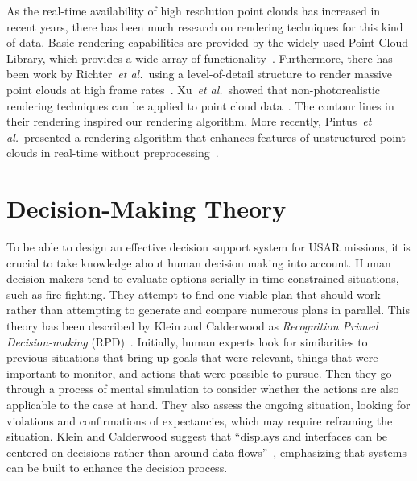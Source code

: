 \documentclass[conference,10pt,letter]{IEEEtran}
\def\etal{\textit{et al.}}
\begin{document}

 As the real-time availability of high resolution point clouds has increased in recent years, there has been much research on rendering techniques for this kind of data. Basic rendering capabilities are provided by the widely used Point Cloud Library, which provides a wide array of functionality~\cite{Rusu11ICRA}. Furthermore, there has been work by Richter~\etal\ using a level-of-detail structure to render massive point clouds at high frame rates~\cite{Richter:2010:ORV:1811158.1811178}. Xu~\etal\ showed that non-photorealistic rendering techniques can be applied to point cloud data~\cite{conf/npar/XuC04}. The contour lines in their rendering inspired our rendering algorithm. More recently, Pintus~\etal\ presented a rendering algorithm that enhances features of unstructured point clouds in real-time without preprocessing~\cite{Pintus:2011:RRM:2384495.2384513}.


\section{Decision-Making Theory} \label{sec:theory}
To be able to design an effective decision support system for USAR missions, it is crucial to take knowledge about human decision making into account. Human decision makers tend to evaluate options serially in time-constrained situations, such as fire fighting. They attempt to find one viable plan that should work rather than attempting to generate and compare numerous plans in parallel. This theory has been described by Klein and Calderwood as \emph{Recognition Primed Decision-making} (RPD)~\cite{KleinCalderwood}. Initially, human experts look for similarities to previous situations that bring up goals that were relevant, things that were important to monitor, and actions that were possible to pursue. Then they go through a process of mental simulation to consider whether the actions are also applicable to the case at hand. They also assess the ongoing situation, looking for violations and confirmations of expectancies, which may require reframing the situation. Klein and Calderwood suggest that ``displays and interfaces can be centered on decisions rather than around data flows''~\cite{KleinCalderwood}, emphasizing that systems can be built to enhance the decision process. 
\end{document}
